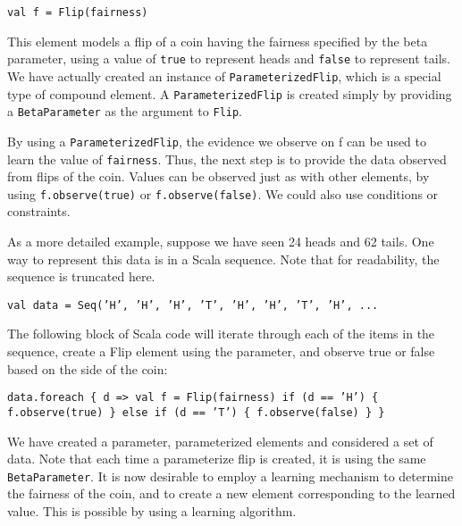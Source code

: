 \begin{flushleft}
\texttt{val f = Flip(fairness)}
\end{flushleft}

This element models a flip of a coin having the fairness specified by the beta parameter, using a value of \texttt{true} to represent heads and \texttt{false} to represent tails. We have actually created an instance of \texttt{ParameterizedFlip}, which is a special type of compound element. A  \texttt{ParameterizedFlip} is created simply by providing a \texttt{BetaParameter} as the argument to \texttt{Flip}.

By using a \texttt{ParameterizedFlip}, the evidence we observe on f can be used to learn the value of \texttt{fairness}. Thus, the next step is to provide the data observed from flips of the coin. Values can be observed just as with other elements, by using \texttt{f.observe(true)} or \texttt{f.observe(false)}. We could also use conditions or constraints.

As a more detailed example, suppose we have seen 24 heads and 62 tails. One way to represent this data is in a Scala sequence. Note that for readability, the sequence is truncated here.

\begin{flushleft}
\texttt{val data = Seq('H', 'H', 'H', 'T', 'H', 'H', 'T', 'H', ...}
\end{flushleft}

The following block of Scala code will iterate through each of the items in the sequence, create a Flip element using the parameter, and observe true or false based on the side of the coin:

\begin{flushleft}
\texttt{data.foreach \{ d =>
\newline val f = Flip(fairness)
\newline \tab if (d == 'H') \{
\newline \tab f.observe(true)
\newline \} else if (d == 'T') \{ 
\newline \tab f.observe(false)
\newline \}
\newline \}
}
\end{flushleft}

We have created a parameter, parameterized elements and considered a set of data. Note that each time a parameterize flip is created, it is using the same \texttt{BetaParameter}. It is now desirable to employ a learning mechanism to determine the fairness of the coin, and to create a new element corresponding to the learned value. This is possible by using a learning algorithm.

